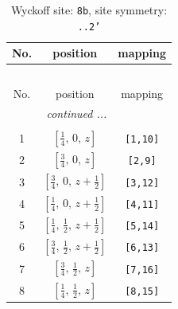 \documentclass[fleqn,8pt]{jsarticle}
\begin{document}
\begin{longtable}{ccc}
\caption{Wyckoff site: {\tt 8b}, site symmetry: {\tt ..2'}}
 \\
 \hline \hline
No. & position & mapping \\ \hline \endfirsthead

\multicolumn{2}{l}{\tablename\ \thetable{}} \\
 \hline \hline
No. & position & mapping \\ \hline \endhead

 \hline \hline
\multicolumn{2}{r}{\footnotesize\it continued ...} \\ \endfoot

 \hline \hline
\multicolumn{2}{r}{} \\ \endlastfoot

1 & $\left[ \frac{1}{4},\, 0,\, z \right]$ & {\tt [1,10]} \\ \hline
2 & $\left[ \frac{3}{4},\, 0,\, z \right]$ & {\tt [2,9]} \\ \hline
3 & $\left[ \frac{3}{4},\, 0,\, z + \frac{1}{2} \right]$ & {\tt [3,12]} \\ \hline
4 & $\left[ \frac{1}{4},\, 0,\, z + \frac{1}{2} \right]$ & {\tt [4,11]} \\ \hline
5 & $\left[ \frac{1}{4},\, \frac{1}{2},\, z + \frac{1}{2} \right]$ & {\tt [5,14]} \\ \hline
6 & $\left[ \frac{3}{4},\, \frac{1}{2},\, z + \frac{1}{2} \right]$ & {\tt [6,13]} \\ \hline
7 & $\left[ \frac{3}{4},\, \frac{1}{2},\, z \right]$ & {\tt [7,16]} \\ \hline
8 & $\left[ \frac{1}{4},\, \frac{1}{2},\, z \right]$ & {\tt [8,15]} \\
\end{longtable}
\renewcommand{\arraystretch}{1.2}
\end{document}
